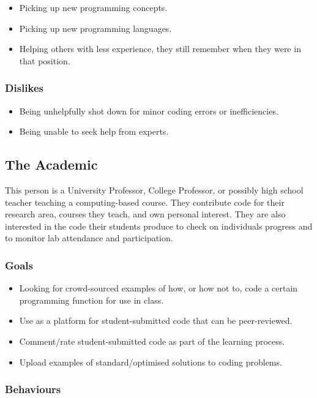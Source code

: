 \documentclass[11pt,a4paper]{article}
\begin{document}
\begin{itemize}
\item Picking up new programming concepts.
\item Picking up new programming languages.
\item Helping others with less experience, they still remember when they were
in that position.
\end{itemize}

\subsubsection{Dislikes}

\begin{itemize}
\item Being unhelpfully shot down for minor coding errors or inefficiencies.
\item Being unable to seek help from experts.
\end{itemize}

\newpage

\subsection{The Academic}

This person is a University Professor, College Professor, or possibly high
school teacher teaching a computing-based course. They contribute code for
their research area, courses they teach, and own personal interest. They are
also interested in the code their students produce to check on individuals
progress and to monitor lab attendance and participation.

\subsubsection{Goals}

\begin{itemize}
\item Looking for crowd-sourced examples of how, or how not to, code a certain
programming function for use in class.
\item Use as a platform for student-submitted code that can be peer-reviewed.
\item Comment/rate student-submitted code as part of the learning process.
\item Upload examples of standard/optimised solutions to coding problems.
\end{itemize}

\subsubsection{Behaviours}
\end{document}
